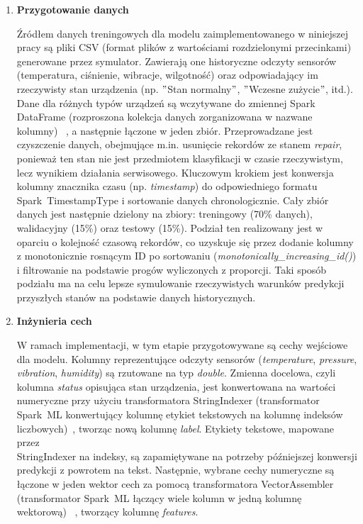 \vspace{0.3em}

\begin{enumerate}
    \setlength\itemsep{0.5em}

    \item \textbf{Przygotowanie danych}

Źródłem danych treningowych dla modelu zaimplementowanego w niniejszej pracy są pliki CSV (format plików z wartościami rozdzielonymi przecinkami)~\cite{csv_rfc} generowane przez symulator. Zawierają one historyczne odczyty sensorów (temperatura, ciśnienie, wibracje, wilgotność) oraz odpowiadający im rzeczywisty stan urządzenia (np. \("\)Stan normalny\("\), \("\)Wczesne zużycie\("\), itd.). Dane dla różnych typów urządzeń są wczytywane do zmiennej Spark DataFrame (rozproszona kolekcja danych zorganizowana w nazwane kolumny)~\cite{chambers2018spark} , a następnie łączone w jeden zbiór. Przeprowadzane jest czyszczenie danych, obejmujące m.in. usunięcie rekordów ze stanem \textit{repair}, ponieważ ten stan nie jest przedmiotem klasyfikacji w czasie rzeczywistym, lecz wynikiem działania serwisowego. Kluczowym krokiem jest konwersja kolumny znacznika czasu (np. \textit{timestamp}) do odpowiedniego formatu \mbox{Spark TimestampType} i sortowanie danych chronologicznie. Cały zbiór danych jest następnie dzielony na zbiory: treningowy (70\% danych), walidacyjny (15\%) oraz testowy (15\%). Podział ten realizowany jest w oparciu o kolejność czasową rekordów, co uzyskuje się przez dodanie kolumny z monotonicznie rosnącym ID po sortowaniu (\textit{monotonically\_increasing\_id()}) i filtrowanie na podstawie progów wyliczonych z proporcji. Taki sposób podziału ma na celu lepsze symulowanie rzeczywistych warunków predykcji przyszłych stanów na podstawie danych historycznych.

 \item \textbf{Inżynieria cech}

W ramach implementacji, w tym etapie przygotowywane są cechy wejściowe dla modelu. Kolumny reprezentujące odczyty sensorów (\textit{temperature}, \textit{pressure}, \textit{vibration}, \textit{humidity}) są rzutowane na typ \textit{double}. Zmienna docelowa, czyli kolumna \textit{status} opisująca stan urządzenia, jest konwertowana na wartości numeryczne przy użyciu transformatora StringIndexer (transformator \mbox{Spark ML} konwertujący kolumnę etykiet tekstowych na kolumnę indeksów liczbowych)~\cite{spark_mllib_reference}, tworząc nową kolumnę \textit{label}. Etykiety tekstowe, mapowane przez \\ StringIndexer na indeksy, są zapamiętywane na potrzeby późniejszej konwersji predykcji z powrotem na tekst. Następnie, wybrane cechy numeryczne są łączone w jeden wektor cech za pomocą transformatora VectorAssembler (transformator \mbox{Spark ML} łączący wiele kolumn w jedną kolumnę wektorową)~\cite{spark_mllib_reference} , tworzący kolumnę \textit{features}.


\end{enumerate}
